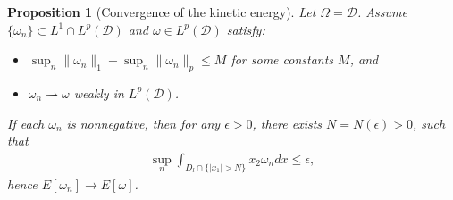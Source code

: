 \documentclass[11pt,letterpaper]{amsart}
\newtheorem{prop}[thm]{Proposition}
\theoremstyle{definition}
\theoremstyle{remark}
\newcommand{\D}{\mathcal{D}}
\renewcommand{\O}{\Omega}
\numberwithin{equation}{section}
\begin{document}
\begin{prop}[Convergence of the kinetic energy]
\label{prop:weak_finite_volume_energy_convergence_with_L^1}
Let $\O=\D$. Assume \(\{\omega_n\} \subset L^1  \cap L^p(\D)\) and \(\omega \in L^p(\D)\) satisfy:
\begin{itemize}
    \item \(\sup_n \|\omega_n\|_1 + \sup_n \|\omega_n\|_p\le M\) for some constants \(M\), and
    \item \(\omega_n \rightharpoonup \omega\) weakly in \(L^p(\mathcal{D})\).
\end{itemize}
If each $\omega_n$ is nonnegative, then for any $\epsilon>0$, there exists $N=N(\epsilon)>0$, such that 
\begin{align}
    \sup_{n}\int_{D_l \cap \{|x_1|>N\}} x_2 \omega_n dx\leq \epsilon, \label{ineq:concentration of bdd seq with L1}
\end{align}
hence 
\(E[\omega_n] \to E[\omega]\).
\end{prop}
\end{document}
